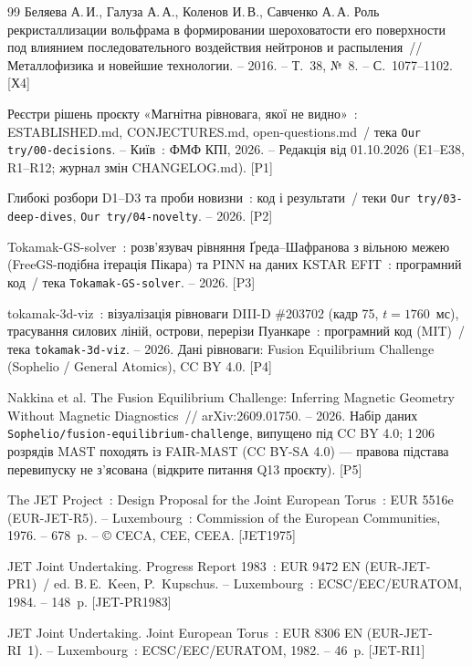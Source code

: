 \begin{thebibliography}{99}
 Беляева А.\,И., Галуза А.\,А., Коленов И.\,В., Савченко А.\,А.
  Роль рекристаллизации вольфрама в формировании шероховатости его поверхности под
  влиянием последовательного воздействия нейтронов и распыления~// Металлофизика и
  новейшие технологии. -- 2016. -- Т.~38, №~8. -- С.~1077--1102. [Х4]

 Реєстри рішень проєкту «Магнітна рівновага, якої не видно»~:
  ESTABLISHED.md, CONJECTURES.md, open-questions.md~/ тека \texttt{Our try/00-decisions}. --
  Київ~: ФМФ КПІ, 2026. -- Редакція від 01.10.2026 (E1--E38, R1--R12; журнал змін CHANGELOG.md). [P1]

 Глибокі розбори D1--D3 та проби новизни~: код і результати~/
  теки \texttt{Our try/03-deep-dives}, \texttt{Our try/04-novelty}. -- 2026. [P2]

 Tokamak-GS-solver~: розв'язувач рівняння Ґреда--Шафранова з вільною межею
  (FreeGS-подібна ітерація Пікара) та PINN на даних KSTAR EFIT~: програмний код~/
  тека \texttt{Tokamak-GS-solver}. -- 2026. [P3]

 tokamak-3d-viz~: візуалізація рівноваги DIII-D \#203702 (кадр 75, $t=1760$~мс),
  трасування силових ліній, острови, перерізи Пуанкаре~: програмний код (MIT)~/
  тека \texttt{tokamak-3d-viz}. -- 2026. Дані рівноваги: Fusion Equilibrium Challenge
  (Sophelio / General Atomics), CC BY 4.0. [P4]

 Nakkina et al. The Fusion Equilibrium Challenge: Inferring Magnetic Geometry
  Without Magnetic Diagnostics~// arXiv:2609.01750. -- 2026. Набір даних
  \texttt{Sophelio/fusion-equilibrium-challenge}, випущено під CC BY 4.0; 1\,206 розрядів MAST походять із FAIR-MAST (CC BY-SA 4.0) --- правова підстава перевипуску не з'ясована (відкрите питання Q13 проєкту). [P5]

 The JET Project~: Design Proposal for the Joint European Torus~: EUR 5516e (EUR-JET-R5). --
  Luxembourg~: Commission of the European Communities, 1976. -- 678~p. -- © CECA, CEE, CEEA. [JET1975]

 JET Joint Undertaking. Progress Report 1983~: EUR 9472 EN (EUR-JET-PR1)~/ ed. B.\,E.~Keen,
  P.~Kupschus. -- Luxembourg~: ECSC/EEC/EURATOM, 1984. -- 148~p. [JET-PR1983]

 JET Joint Undertaking. Joint European Torus~: EUR 8306 EN (EUR-JET-RI~1). --
  Luxembourg~: ECSC/EEC/EURATOM, 1982. -- 46~p. [JET-RI1]


\end{thebibliography}
